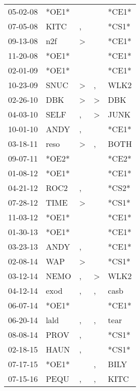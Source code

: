 \begin{supertabular}{lllll}
 05-02-08 &  *OE1* &               &               &  *CE1* \\
 07-05-08 &   KITC &             , &               &  *CS1* \\
 09-13-08 &    n2f &  \textgreater &               &  *CE1* \\
 11-20-08 &  *OE1* &               &               &  *CE1* \\
 02-01-09 &  *OE1* &               &               &  *CE1* \\
 10-23-09 &   SNUC &  \textgreater &             , &   WLK2 \\
 02-26-10 &    DBK &  \textgreater &  \textgreater &    DBK \\
 04-03-10 &   SELF &             , &  \textgreater &   JUNK \\
 10-01-10 &   ANDY &             , &               &  *CE1* \\
 03-18-11 &   reso &  \textgreater &             , &   BOTH \\
 09-07-11 &  *OE2* &               &               &  *CE2* \\
 01-08-12 &  *OE1* &               &               &  *CE1* \\
 04-21-12 &   ROC2 &             , &               &  *CS2* \\
 07-28-12 &   TIME &  \textgreater &               &  *CS1* \\
 11-03-12 &  *OE1* &               &               &  *CE1* \\
 01-30-13 &  *OE1* &               &               &  *CE1* \\
 03-23-13 &   ANDY &             , &               &  *CE1* \\
 02-08-14 &    WAP &  \textgreater &               &  *CS1* \\
 03-12-14 &   NEMO &             , &  \textgreater &   WLK2 \\
 04-12-14 &   exod &             , &             , &   casb \\
 06-07-14 &  *OE1* &               &               &  *CE1* \\
 06-20-14 &   lald &             , &             , &   tear \\
 08-08-14 &   PROV &             , &               &  *CS1* \\
 02-18-15 &   HAUN &             , &               &  *CS1* \\
 07-17-15 &  *OE1* &               &             , &   BILY \\
 07-15-16 &   PEQU &             , &             , &   KITC \\

\end{supertabular}
